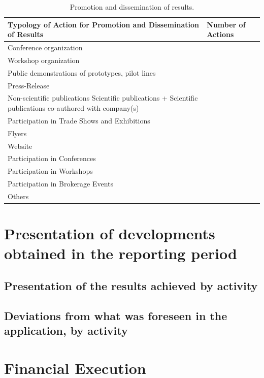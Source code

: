 \documentclass{ani}
\begin{document}
\begin{table}[!htp]
  \begin{tabular}{|p{}|p{}|}
    \hline
    \textbf{Typology of Action for Promotion and Dissemination of Results} & \textbf{Number of Actions} \\ \hline
    Conference organization                                          &  \\ \hline
    Workshop organization                                            &  \\ \hline
    Public demonstrations of prototypes, pilot lines                 &  \\ \hline
    Press-Release                                                    &  \\ \hline
    Non-scientific publications Scientific publications + Scientific publications co-authored with company(s) &  \\ \hline
    Participation in Trade Shows and Exhibitions                     &  \\ \hline
    Flyers                                                           &  \\ \hline
    Website                                                          &  \\ \hline
    Participation in Conferences                                     &  \\ \hline
    Participation in Workshops                                       &  \\ \hline
    Participation in Brokerage Events                                &  \\ \hline
    Others                                                           &  \\ \hline
  \end{tabular}
  \caption{Promotion and dissemination of results.}
\end{table}


\chapter{Presentation of developments obtained in the reporting period}

\section{Presentation of the results achieved by activity}
\cite{sigfridsson}\lipsum[25-30]

\section{Deviations from what was foreseen in the application, by activity}
\lipsum[30-32]

\chapter{Financial Execution}
\lipsum[33-35]



\nocite{*}


\end{document}
